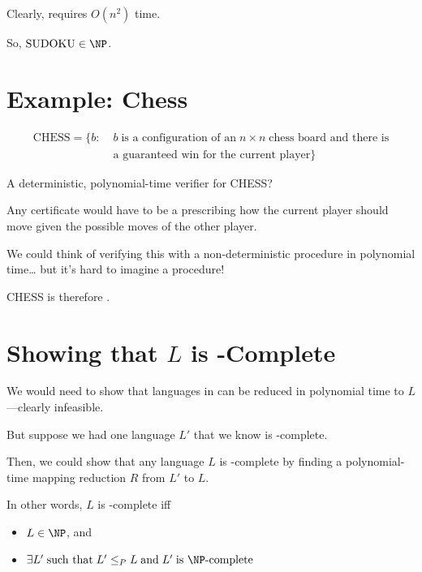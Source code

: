 \documentclass[a4paper]{report}
\newcommand{\bookref}[3]{\marginpar{\faBook{}~#1\\Chapter #2\\Section #3}}
\theoremstyle{definition}
\begin{document}
Clearly, requires $O(n^2)$ time.

So, $\text{SUDOKU} \in \NP$.


\section{Example: Chess}
\bookref{ER}{28}{28.5.1}
\vspace{-0.3cm}%
\begin{align*}
\text{CHESS} = \{ b : &\; b \;\text{is a configuration of an} \; n \times n \;\text{chess board and there is}\\ & \;\text{a guaranteed win for the current player}\}
\end{align*}

\vspace{-0.3cm}%
\noindent A deterministic, polynomial-time verifier for CHESS?

Any certificate would have to be a  prescribing how the current player should move given the possible moves of the other player.

We could think of verifying this with a non-deterministic procedure in polynomial time\dots{} but it's hard to imagine a  procedure!

CHESS is therefore .

\section{Showing that $L$ is \NP-Complete}
\bookref{ER}{28}{28.6.2}
We would need to show that  languages in \NP{} can be reduced in polynomial time to $L$---clearly infeasible.

But suppose we had one language $L'$ that we know is \NP-complete.

Then, we could show that any language $L$ is \NP-complete by finding a polynomial-time mapping reduction $R$ from $L'$ to $L$.

In other words, $L$ is \NP-complete iff

\begin{itemize}
\item {} $L \in \NP$, and
\item {} $\exists L' \;\text{such that}\; L' \leq_{P} L \;\text{and}\; L' \;\text{is \NP-complete}$
\end{itemize}
\end{document}
